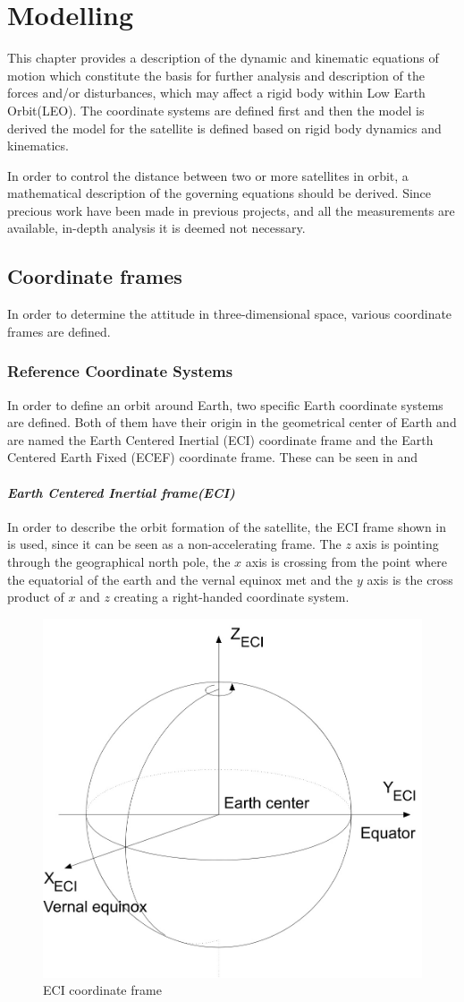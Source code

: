 \chapter{Modelling}
This chapter provides a description of the dynamic and kinematic equations of motion which constitute the basis for further analysis and description of the forces and/or disturbances, which may affect a rigid body within  Low Earth Orbit(LEO). The coordinate systems are defined first and then the model is derived the model for the satellite is defined based on rigid body dynamics and kinematics. 

In order to control the distance between two or more satellites in orbit, a mathematical description of the governing equations should be derived. Since precious work have been made in previous projects, and all the measurements are available, in-depth analysis it is deemed not necessary. 
%
\section{Coordinate frames}
In order to determine the attitude in three-dimensional space, various coordinate frames are defined.
\subsection{Reference Coordinate Systems}
In order to define an orbit around Earth, two specific Earth coordinate systems are defined. Both of them have their origin in the geometrical center of Earth and are named the Earth Centered Inertial (ECI) coordinate frame and the Earth Centered Earth Fixed (ECEF) coordinate frame. These can be seen in  and 
\subsubsection{\textit{Earth Centered Inertial frame(ECI)}}
In order to describe the orbit formation of the satellite, the ECI frame shown in  is used, since it can be seen as a non-accelerating frame. The $z$ axis is pointing through the geographical north pole, the $x$ axis is crossing from the point where the equatorial of the earth and the vernal equinox met and the $y$ axis is the cross product of $x$ and $z$ creating a right-handed coordinate system. 
\begin{figure}[H]
	\centering
	\includegraphics[width=0.5\linewidth]{figures/ECI}
	\caption{ECI coordinate frame}
	\label{fig:ECI}
\end{figure}
